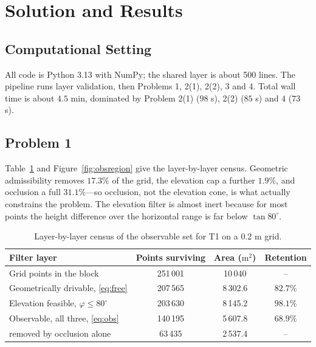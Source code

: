 \documentclass[12pt]{article}
\begin{document}
\section{Solution and Results}

\subsection{Computational Setting}

All code is Python 3.13 with NumPy; the shared layer is about 500 lines. The pipeline runs layer validation, then Problems 1, 2(1), 2(2), 3 and 4. Total wall time is about $4.5$ min, dominated by Problem 2(1) ($98$ s), 2(2) ($85$ s) and 4 ($73$ s).

\subsection{Problem 1}

Table~\ref{tab:q1area} and Figure~\ref{fig:obsregion} give the layer-by-layer census. Geometric admissibility removes $17.3\%$ of the grid, the elevation cap a further $1.9\%$, and occlusion a full $31.1\%$---so occlusion, not the elevation cone, is what actually constrains the problem. The elevation filter is almost inert because for most points the height difference over the horizontal range is far below $\tan80^\circ$.

\begin{table}[htbp]
  \centering
  \caption{Layer-by-layer census of the observable set for T1 on a 0.2 m grid.}
  \label{tab:q1area}
  \begin{tabular}{lccc}
    \toprule
    Filter layer & Points surviving & Area ($\mathrm{m^2}$) & Retention \\
    \midrule
    Grid points in the block & 251\,001 & 10\,040 & -- \\
    Geometrically drivable, \eqref{eq:free} & 207\,565 & 8\,302.6 & $82.7\%$ \\
    Elevation feasible, $\varphi\le80^\circ$ & 203\,630 & 8\,145.2 & $98.1\%$ \\
    Observable, all three, \eqref{eq:obs} & 140\,195 & 5\,607.8 & $68.9\%$ \\
    \quad removed by occlusion alone & 63\,435 & 2\,537.4 & -- \\
    \bottomrule
  \end{tabular}
\end{table}
\end{document}
